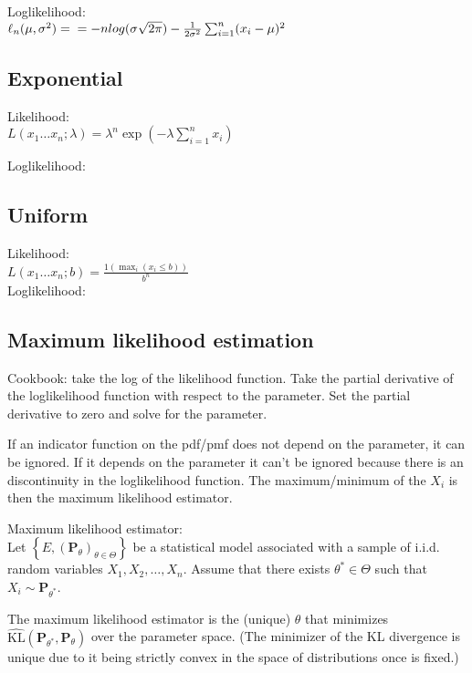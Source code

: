Loglikelihood:\\

$\ell_n (\mu,\sigma^2)= \\
= -n log(\sigma\sqrt{2\pi})-\frac{1}{2\sigma^2}\sum_{i=1}^n (x_i-\mu)^2 $


\subsection*{Exponential}

Likelihood:\\
$L(x_1\dots x_n;\lambda)=\lambda^n\exp\left(-\lambda\sum_{i=1}^n x_i\right)$

Loglikelihood:\\

\subsection*{Uniform}

Likelihood:\\
$L(x_1\dots x_n;b)=\frac{1(\max_i (x_i \leq b))} {b^n}$\\

Loglikelihood:\\

\subsection*{Maximum likelihood estimation}

Cookbook: take the log of the likelihood function. Take the partial derivative of the loglikelihood function with respect to the parameter. Set the partial derivative to zero and solve for the parameter.

If an indicator function on the pdf/pmf does not depend on the parameter, it can be ignored. If it depends on the parameter it can't be ignored because there is an discontinuity in the loglikelihood function. The maximum/minimum of the $X_i$ is then the maximum likelihood estimator.

Maximum likelihood estimator:\\

Let $\left\{ E,\left(\mathbf{P}_{\theta }\right)_{\theta \in \Theta }\right\}$  be a statistical model associated with a sample of i.i.d. random variables $X_1, X_2, \dots , X_ n$. Assume that there exists $\theta ^* \in \Theta$ such that $X_ i \sim \mathbf{P}_{\theta ^*}$.

The maximum likelihood estimator is the (unique) $\theta$ that minimizes $\widehat{\text {KL}}\left(\mathbf{P}_{\theta ^*}, \mathbf{P}_{\theta }\right)$ over the parameter space. (The minimizer of the KL divergence is unique due to it being strictly convex in the space of distributions once  is fixed.)

